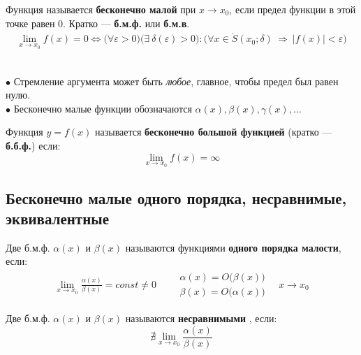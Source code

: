 \begin{definition}
  Функция называется \textbf{бесконечно малой} при $x \to x_0$, если предел функции в этой точке равен $0$. Кратко --- \textbf{б.м.ф.} или \textbf{б.м.в}.
  \begin{gather*}
    \lim_{x \to x_0} f(x) = 0 \iff \big(\forall \varepsilon > 0\big)\big(\exists\ \delta(\varepsilon) > 0\big)\colon \big(\forall x \in \mathring{S}(x_0; \delta)\ \Rightarrow\ |f(x)| < \varepsilon \big)
  \end{gather*}
\end{definition}
\begin{note}\ \\
  $\bullet$ Стремление аргумента может быть \textit{любое}, главное, чтобы предел был равен нулю.\\
  $\bullet$ Бесконечно малые функции обозначаются $\alpha(x), \beta(x), \gamma(x),\ldots$
\end{note}

\begin{definition}
  Функция $y = f(x)$ называется \textbf{бесконечно большой функцией} (кратко --- \textbf{б.б.ф.}) если: \[ \lim_{x \to x_0} f(x) = \infty \] 
\end{definition}


\subsection{Бесконечно малые одного порядка, несравнимые, эквивалентные}

\begin{definition}
  Две б.м.ф. $\alpha(x)$ и $\beta(x)$ называются функциями \textbf{одного порядка малости}, если:
  \begin{gather*}
  \lim_{x \to x_0} \frac{\alpha(x)}{\beta(x)} = const \neq 0 \qquad
    \begin{aligned}
      \alpha(x) = O\big(\beta(x)\big) \\
      \beta(x) = O\big(\alpha(x)\big)
    \end{aligned}\quad x\to x_0
  \end{gather*}
\end{definition}

\begin{definition}
  Две б.м.ф. $\alpha(x)$ и $\beta(x)$ называются \textbf{несравнимыми} , если:
  \[
  \nexists \lim_{x \to x_0} \frac{\alpha(x)}{\beta(x)}
  \] 
\end{definition}

